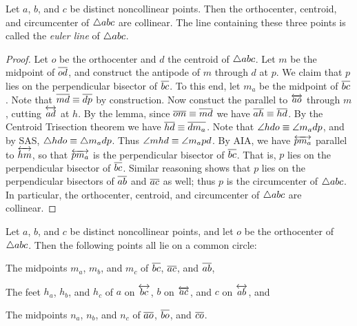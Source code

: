 \begin{prop}

\end{prop}

\begin{prop}
Let \(a\), \(b\), and \(c\) be distinct noncollinear points.
Then the orthocenter, centroid, and circumcenter of \(\bigtriangleup{abc}\) are collinear.
The line containing these three points is called the \emph{euler line} of \(\bigtriangleup{abc}\).
\end{prop}

\begin{proof}
Let \(o\) be the orthocenter and \(d\) the centroid of \(\bigtriangleup{abc}\).
Let \(m\) be the midpoint of \(\overline{od}\), and construct the antipode of \(m\) through \(d\) at \(p\).
We claim that \(p\) lies on the perpendicular bisector of \(\overline{bc}\).
To this end, let \(m_a\) be the midpoint of \(\overline{bc}\).
Note that \(\overline{md} \equiv \overline{dp}\) by construction.
Now constuct the parallel to \(\overleftrightarrow{ao}\) through \(m\), cutting \(\overleftrightarrow{ad}\) at \(h\).
By the lemma, since \(\overline{om} \equiv \overline{md}\) we have \(\overline{ah} \equiv \overline{hd}\).
By the Centroid Trisection theorem we have \(\overline{hd} \equiv \overline{dm_a}\).
Note that \(\angle{hdo} \equiv \angle{m_adp}\), and by SAS, \(\bigtriangleup{hdo} \equiv \bigtriangleup{m_adp}\).
Thus \(\angle{mhd} \equiv \angle{m_apd}\).
By AIA, we have \(\overleftrightarrow{pm_a}\) parallel to \(\overleftrightarrow{hm}\), so that \(\overleftrightarrow{pm_a}\) is the perpendicular bisector of \(\overline{bc}\).
That is, \(p\) lies on the perpendicular bisector of \(\overline{bc}\).
Similar reasoning shows that \(p\) lies on the perpendicular bisectors of \(\overline{ab}\) and \(\overline{ac}\) as well; thus \(p\) is the circumcenter of \(\bigtriangleup{abc}\).
In particular, the orthocenter, centroid, and circumcenter of \(\bigtriangleup{abc}\) are collinear.
\end{proof}


\begin{prop}
Let \(a\), \(b\), and \(c\) be distinct noncollinear points, and let \(o\) be the orthocenter of \(\bigtriangleup{abc}\).
Then the following points all lie on a common circle:
\begin{proplist}
\item The midpoints \(m_a\), \(m_b\), and \(m_c\) of \(\overline{bc}\), \(\overline{ac}\), and \(\overline{ab}\),
\item The feet \(h_a\), \(h_b\), and \(h_c\) of \(a\) on \(\overleftrightarrow{bc}\), \(b\) on \(\overleftrightarrow{ac}\), and \(c\) on \(\overleftrightarrow{ab}\), and
\item The midpoints \(n_a\), \(n_b\), and \(n_c\) of \(\overline{ao}\), \(\overline{bo}\), and \(\overline{co}\).
\end{proplist}
\end{prop}

